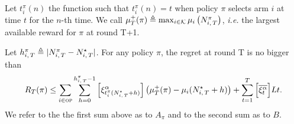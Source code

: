 Let $t_i^\pi(n)$ the function such that $t_i^\pi(n) = t$ when policy $\pi$ selects arm $i$ at time $t$ for the $n$-th time. We call $\mu_T^+(\pi) \triangleq \max_{i \in \mathcal{K}} \mu_i\left(N_{i,\,T}^\pi\right)$, \textit{i.e.} the largest available reward for $\pi$ at round T+1.  
\begin{lemma}
\label{lem:regret-decompo}
 Let $h_{i,\,T}^\pi \triangleq | N_{i,\,T}^\pi - N_{i,\,T}^{\star}|$. For any policy $\pi$, the regret at round T is no bigger than
\begin{equation*}
R_T(\pi) \leq \sum_{i \in \textsc{op}} \sum_{h=0}^{h_{i,\,T}^\pi-1}\left[\xi^\alpha_{t_i^\pi(N_{i,\,T}^\star + h)} \right]\left(\mu^+_T(\pi) - \mu_i(N_{i,\,T}^{\star} + h ) \right) + \sum_{t=1}^T \Big[\overline{\xi^\alpha_t}\Big]Lt.
\end{equation*}
We refer to the the first sum above as to $A_\pi$ and to the second sum as to $B$.
\end{lemma}
